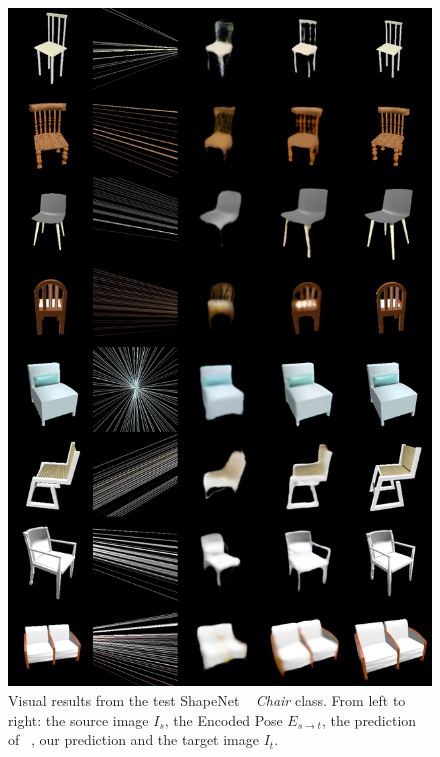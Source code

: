 \begin{figure}[htp!]
    \begin{center}
    \includegraphics[width=.9\textwidth]{images/epipolarnvs/SuppMat_Chair.jpg}
    \end{center}
     \caption{Visual results from the test ShapeNet ~\cite{Shapenet} \textit{Chair} class. From left to right: the source image  $I_s$, the Encoded Pose $E_{s\xrightarrow{}t}$,  the prediction of ~\cite{NVS_skip}, our prediction and the target image $I_t$.}
     \label{fig:add_visChair}
\end{figure}

